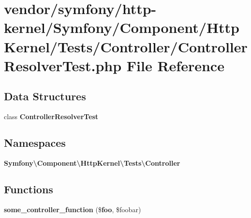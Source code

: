 \section{vendor/symfony/http-\/kernel/\+Symfony/\+Component/\+Http\+Kernel/\+Tests/\+Controller/\+Controller\+Resolver\+Test.php File Reference}
\label{_controller_resolver_test_8php}
\subsection*{Data Structures}
\begin{DoxyCompactItemize}
\item 
class {\bf Controller\+Resolver\+Test}
\end{DoxyCompactItemize}
\subsection*{Namespaces}
\begin{DoxyCompactItemize}
\item 
 {\bf Symfony\textbackslash{}\+Component\textbackslash{}\+Http\+Kernel\textbackslash{}\+Tests\textbackslash{}\+Controller}
\end{DoxyCompactItemize}
\subsection*{Functions}
\begin{DoxyCompactItemize}
\item 
{\bf some\+\_\+controller\+\_\+function} (\${\bf foo}, \$foobar)
\end{DoxyCompactItemize}
